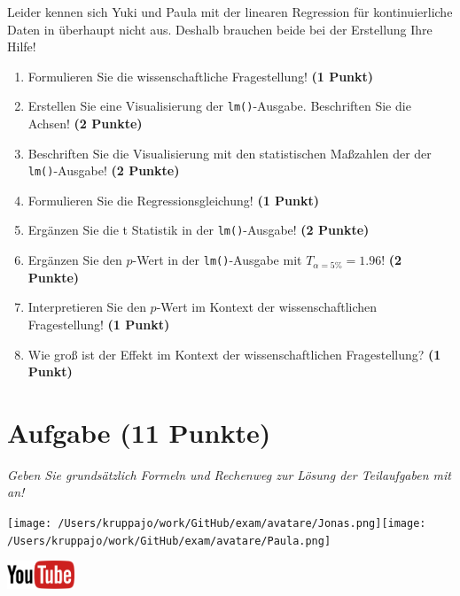 \documentclass[a4paper, 9pt]{scrartcl}\usepackage[]{graphicx}\usepackage[]{xcolor}
\begin{document}
Leider kennen sich Yuki und Paula mit der linearen Regression für kontinuierliche Daten in \Rlogo überhaupt nicht aus. Deshalb brauchen beide bei der Erstellung Ihre Hilfe!

\begin{enumerate}
\item Formulieren Sie die wissenschaftliche Fragestellung! \textbf{(1 Punkt)}
\item Erstellen  Sie  eine  Visualisierung  der \texttt{lm()}-Ausgabe.  Beschriften  Sie  die  Achsen! \textbf{(2 Punkte)}
\item Beschriften Sie die Visualisierung mit den statistischen Maßzahlen der der \texttt{lm()}-Ausgabe! \textbf{(2 Punkte)}
\item Formulieren Sie die Regressionsgleichung! \textbf{(1 Punkt)}
\item Ergänzen Sie die t Statistik in der \texttt{lm()}-Ausgabe! \textbf{(2 Punkte)}
\item Ergänzen Sie den $p$-Wert in der \texttt{lm()}-Ausgabe mit $T_{\alpha = 5\%} = 1.96$!  \textbf{(2 Punkte)}
\item Interpretieren Sie den $p$-Wert im Kontext der wissenschaftlichen Fragestellung! \textbf{(1 Punkt)}  
\item Wie groß ist der Effekt im Kontext der wissenschaftlichen Fragestellung? \textbf{(1 Punkt)}
\end{enumerate} 
\clearpage

\section{Aufgabe \hfill (11 Punkte)}

\textit{Geben Sie grundsätzlich Formeln und Rechenweg zur Lösung der Teilaufgaben mit an!} \\[1Ex]
 

 
\begin{minipage}[t]{0.5\textwidth}
\texttt{[image: /Users/kruppajo/work/GitHub/exam/avatare/Jonas.png]}\hspace{-4mm}\texttt{[image: /Users/kruppajo/work/GitHub/exam/avatare/Paula.png]}
\end{minipage}
\begin{minipage}[t]{0.5\textwidth}
\hfill
\href{https://youtu.be/tNNzcndrpSk}{\includegraphics[width = 2cm]{img/youtube}}
\end{minipage}
\vspace{1ex}
\end{document}

